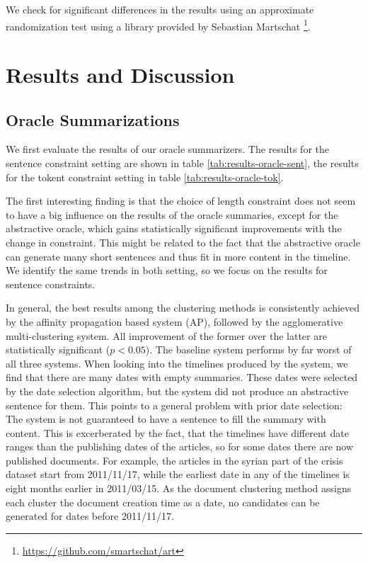 \documentclass[a4paper,BCOR=10mm]{report}
\numberwithin{lemma}{chapter}
\numberwithin{definition}{chapter}
\begin{document}
We check for significant differences in the results using an approximate randomization test \citep{art} using a library provided by Sebastian Martschat \footnote{\url{https://github.com/smartschat/art}}. %

\section{Results and Discussion}

\subsection{Oracle Summarizations}

We first evaluate the results of our oracle summarizers. The results for the sentence constraint setting are shown in table \ref{tab:results-oracle-sent}, the results for the tokent constraint setting in table \ref{tab:results-oracle-tok}.

The first interesting finding is that the choice of length constraint does not seem to have a big influence on the results of the oracle summaries, except for the abstractive oracle, which gains statistically significant improvements with the change in constraint.
This might be related to the fact that the abstractive oracle can generate many short sentences and thus fit in more content in the timeline.
We identify the same trends in both setting, so we focus on the results for sentence constraints.

In general, the best results among the clustering methods is consistently achieved by the affinity propagation based system (AP), followed by the agglomerative multi-clustering system. All improvement of the former over the latter are statistically significant ($p < 0.05$). The baseline system performs by far worst of all three systems. When looking into the timelines produced by the system, we find that there are many dates with empty summaries. These dates were selected by the date selection algorithm, but the system did not produce an abstractive sentence for them. This points to a general problem with prior date selection: The system is not guaranteed to have a sentence to fill the summary with content. This is excerberated by the fact, that the timelines have different date ranges than the publishing dates of the articles, so for some dates there are now published documents. For example, the articles in the syrian part of the crisis dataset start from 2011/11/17, while the earliest date in any of the timelines is eight months earlier in 2011/03/15. As the document clustering method assigns each cluster the document creation time as a date, no candidates can be generated for dates before 2011/11/17.
\end{document}

